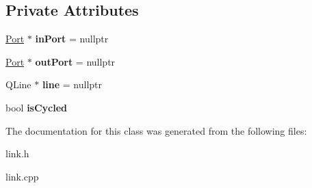 \subsection*{Private Attributes}
\begin{DoxyCompactItemize}
\item 
\mbox{\label{classLink_a6e935a336f4a03071fcc2b592276c4ca}} 
\hyperlink{classPort}{Port} $\ast$ {\bfseries in\+Port} = nullptr
\item 
\mbox{\label{classLink_a0e326445a40f370fbaec9b1bbfd3fc2d}} 
\hyperlink{classPort}{Port} $\ast$ {\bfseries out\+Port} = nullptr
\item 
\mbox{\label{classLink_af181aac9843b389800939c294c01d4ac}} 
Q\+Line $\ast$ {\bfseries line} = nullptr
\item 
\mbox{\label{classLink_a70e3252b06be7f81d6345ad1197dc18c}} 
bool {\bfseries is\+Cycled}
\end{DoxyCompactItemize}


The documentation for this class was generated from the following files\+:\begin{DoxyCompactItemize}
\item 
link.\+h\item 
link.\+cpp\end{DoxyCompactItemize}
